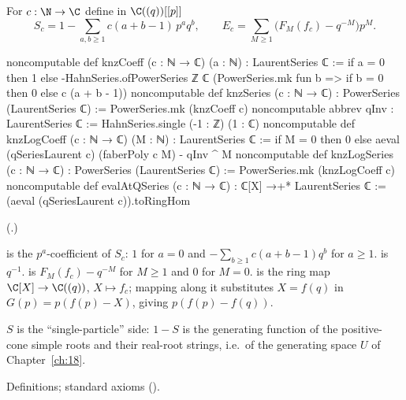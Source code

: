 \begin{definition}\label{ch19:def:knz}
For $c:\N\to\C$ define in $\C((q))[[p]]$
\begin{equation*}
  S_c=1-\sum_{a,b\ge1}c(a+b-1)\,p^aq^b,\qquad E_c=\sum_{M\ge1}\bigl(F_M(f_c)-q^{-M}\bigr)p^M .
\end{equation*}
\end{definition}
\begin{leancode}
noncomputable def knzCoeff (c : ℕ → ℂ) (a : ℕ) : LaurentSeries ℂ :=
  if a = 0 then 1 else
    -HahnSeries.ofPowerSeries ℤ ℂ (PowerSeries.mk fun b => if b = 0 then 0 else c (a + b - 1))
noncomputable def knzSeries (c : ℕ → ℂ) : PowerSeries (LaurentSeries ℂ) :=
  PowerSeries.mk (knzCoeff c)
noncomputable abbrev qInv : LaurentSeries ℂ := HahnSeries.single (-1 : ℤ) (1 : ℂ)
noncomputable def knzLogCoeff (c : ℕ → ℂ) (M : ℕ) : LaurentSeries ℂ :=
  if M = 0 then 0 else aeval (qSeriesLaurent c) (faberPoly c M) - qInv ^ M
noncomputable def knzLogSeries (c : ℕ → ℂ) : PowerSeries (LaurentSeries ℂ) :=
  PowerSeries.mk (knzLogCoeff c)
noncomputable def evalAtQSeries (c : ℕ → ℂ) : ℂ[X] →+* LaurentSeries ℂ :=
  (aeval (qSeriesLaurent c)).toRingHom
\end{leancode}
(.)
\begin{dictionary}
 is the $p^a$-coefficient of $S_c$: $1$ for $a=0$ and $-\sum_{b\ge1}c(a+b-1)q^b$ for $a\ge1$.
 is $q^{-1}$.   is $F_M(f_c)-q^{-M}$ for $M\ge1$ and $0$ for $M=0$.  
is the ring map $\C[X]\to\C((q))$, $X\mapsto f_c$; mapping  along it substitutes $X=f(q)$ in
$G(p)=p(f(p)-X)$, giving $p(f(p)-f(q))$.
\end{dictionary}
\begin{physics}
$S$ is the ``single-particle'' side: $1-S$ is the generating function of the positive-cone simple roots and their
real-root strings, i.e.\ of the generating space $U$ of Chapter~\ref{ch:18}.
\end{physics}
\begin{status}Definitions; standard axioms ().\end{status}

